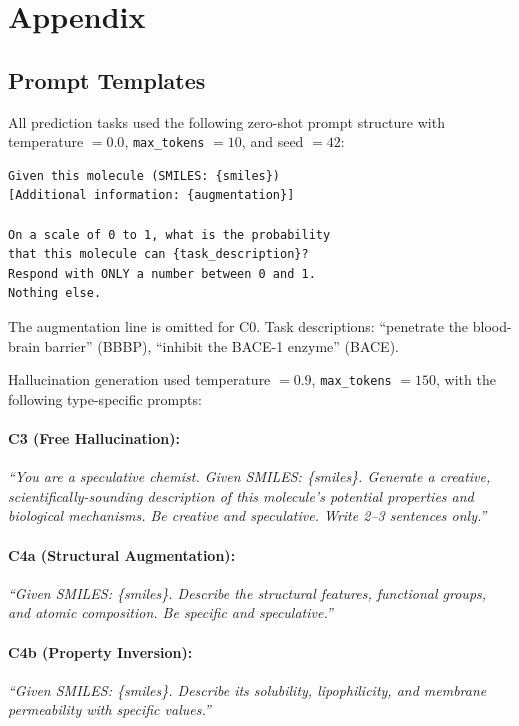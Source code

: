 \section{Appendix}
\label{sec:appendix}

\subsection{Prompt Templates}
All prediction tasks used the following zero-shot prompt structure with temperature $= 0.0$, \texttt{max\_tokens} $= 10$, and seed $= 42$:

\begin{verbatim}
Given this molecule (SMILES: {smiles})
[Additional information: {augmentation}]

On a scale of 0 to 1, what is the probability
that this molecule can {task_description}?
Respond with ONLY a number between 0 and 1.
Nothing else.
\end{verbatim}

The augmentation line is omitted for C0. Task descriptions: ``penetrate the blood-brain barrier'' (BBBP), ``inhibit the BACE-1 enzyme'' (BACE).

Hallucination generation used temperature $= 0.9$, \texttt{max\_tokens} $= 150$, with the following type-specific prompts:

\paragraph{C3 (Free Hallucination):}
\textit{``You are a speculative chemist. Given SMILES: \{smiles\}. Generate a creative, scientifically-sounding description of this molecule's potential properties and biological mechanisms. Be creative and speculative. Write 2--3 sentences only.''}

\paragraph{C4a (Structural Augmentation):}
\textit{``Given SMILES: \{smiles\}. Describe the structural features, functional groups, and atomic composition. Be specific and speculative.''}

\paragraph{C4b (Property Inversion):}
\textit{``Given SMILES: \{smiles\}. Describe its solubility, lipophilicity, and membrane permeability with specific values.''}

